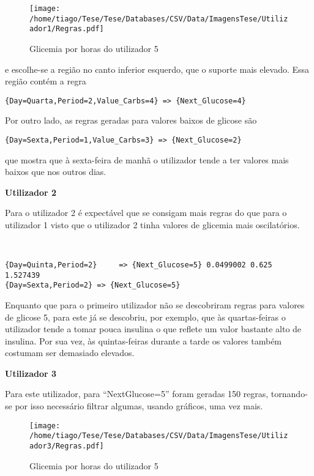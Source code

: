 \begin{figure}[H]
\centering
\texttt{[image: /home/tiago/Tese/Tese/Databases/CSV/Data/ImagensTese/Utilizador1/Regras.pdf]}
\caption{Glicemia por horas do utilizador 5}
\end{figure}

e escolhe-se a região no canto inferior esquerdo, que o suporte mais elevado. Essa região contém a regra

\begin{lstlisting}
{Day=Quarta,Period=2,Value_Carbs=4} => {Next_Glucose=4}

\end{lstlisting}

Por outro lado, as regras geradas para valores baixos de glicose são

\begin{lstlisting}
{Day=Sexta,Period=1,Value_Carbs=3} => {Next_Glucose=2}
\end{lstlisting}

que mostra que à sexta-feira de manhã o utilizador tende a ter valores mais baixos que nos outros dias.


\textbf{Utilizador 2}

Para o utilizador 2 é expectável que se consigam mais regras do que para o utilizador 1 visto que o utilizador 2 tinha valores de glicemia mais oscilatórios. 

\begin{lstlisting}


{Day=Quinta,Period=2}     => {Next_Glucose=5} 0.0499002 0.625      1.527439
{Day=Sexta,Period=2} => {Next_Glucose=5}

\end{lstlisting}

Enquanto que para o primeiro utilizador não se descobriram regras para valores de glicose 5, para este já se descobriu, por exemplo, que às quartas-feiras o utilizador tende a tomar pouca insulina o que reflete um valor bastante alto de insulina. Por sua vez, às quintas-feiras durante a tarde os valores também costumam ser demasiado elevados. 






\textbf{Utilizador 3}

Para este utilizador, para ``Next\textunderscore Glucose=5'' foram geradas 150 regras, tornando-se por isso necessário filtrar algumas, usando gráficos, uma vez mais. 


\begin{figure}[H]
\centering
\texttt{[image: /home/tiago/Tese/Tese/Databases/CSV/Data/ImagensTese/Utilizador3/Regras.pdf]}
\caption{Glicemia por horas do utilizador 5}
\end{figure}

